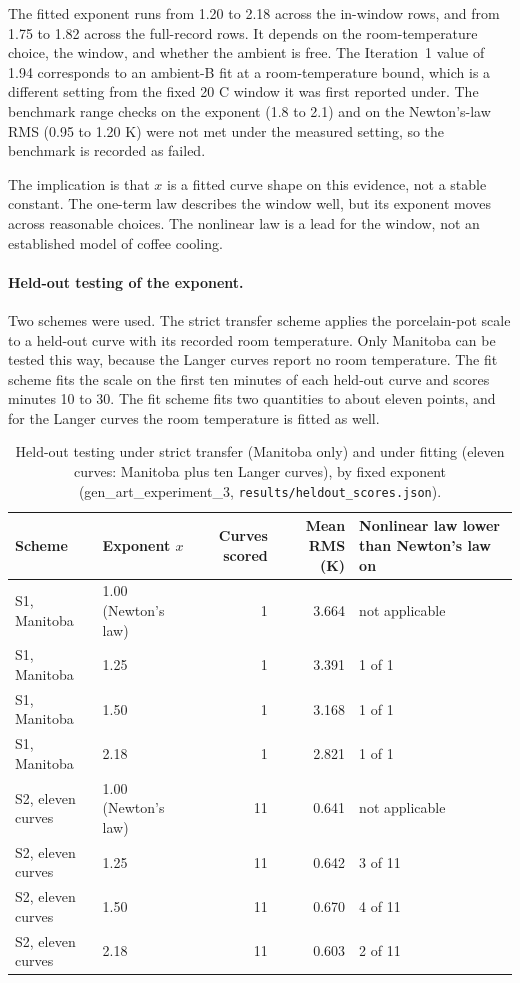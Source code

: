 \documentclass[11pt,letterpaper]{article}
\begin{document}
The fitted exponent runs from 1.20 to 2.18 across the in-window rows, and from 1.75 to 1.82 across the full-record rows. It depends on the room-temperature choice, the window, and whether the ambient is free. The Iteration~1 value of 1.94 corresponds to an ambient-B fit at a room-temperature bound, which is a different setting from the fixed 20 C window it was first reported under. The benchmark range checks on the exponent (1.8 to 2.1) and on the Newton's-law RMS (0.95 to 1.20 K) were not met under the measured setting, so the benchmark is recorded as failed.

The implication is that $x$ is a fitted curve shape on this evidence, not a stable constant. The one-term law describes the window well, but its exponent moves across reasonable choices. The nonlinear law is a lead for the window, not an established model of coffee cooling.

\paragraph{Held-out testing of the exponent.} Two schemes were used. The strict transfer scheme applies the porcelain-pot scale to a held-out curve with its recorded room temperature. Only Manitoba can be tested this way, because the Langer curves report no room temperature. The fit scheme fits the scale on the first ten minutes of each held-out curve and scores minutes 10 to 30. The fit scheme fits two quantities to about eleven points, and for the Langer curves the room temperature is fitted as well.

\begin{table}[!htbp]
\centering
\small
\caption{Held-out testing under strict transfer (Manitoba only) and under fitting (eleven curves: Manitoba plus ten Langer curves), by fixed exponent (gen\_art\_experiment\_3, \texttt{results/heldout\_scores.json}).}
\label{tab:it2-heldout-x}
\begin{tabularx}{\linewidth}{p{3.2cm}p{2.4cm}rrX}
\toprule
Scheme & Exponent $x$ & Curves scored & Mean RMS (K) & Nonlinear law lower than Newton's law on \\
\midrule
S1, Manitoba & 1.00 (Newton's law) & 1 & 3.664 & not applicable \\
S1, Manitoba & 1.25 & 1 & 3.391 & 1 of 1 \\
S1, Manitoba & 1.50 & 1 & 3.168 & 1 of 1 \\
S1, Manitoba & 2.18 & 1 & 2.821 & 1 of 1 \\
S2, eleven curves & 1.00 (Newton's law) & 11 & 0.641 & not applicable \\
S2, eleven curves & 1.25 & 11 & 0.642 & 3 of 11 \\
S2, eleven curves & 1.50 & 11 & 0.670 & 4 of 11 \\
S2, eleven curves & 2.18 & 11 & 0.603 & 2 of 11 \\
\bottomrule
\end{tabularx}
\end{table}
\end{document}
